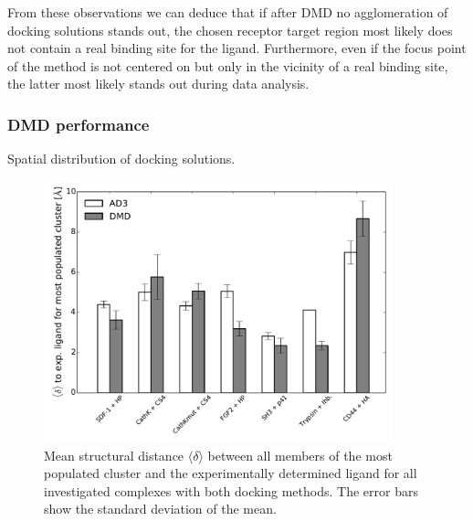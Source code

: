 From these observations we can deduce that if after DMD no agglomeration of
docking solutions stands out, the chosen receptor target region most likely does
not contain a real binding site for the ligand. Furthermore, even if the focus
point of the method is not centered on but only in the vicinity of a real
binding site, the latter most likely stands out during data analysis.

\subsubsection{DMD performance}

{\sffamily Spatial distribution of docking solutions.}

\begin{figure}
\centering
\includegraphics[width=0.9\textwidth]{gfx/dmd/figure_4_clustering_dmd_vs_ad3_plots_pub_004.pdf}
\caption[]{
Mean structural distance $\langle \delta \rangle$ between all members of the
most populated cluster and the experimentally determined ligand for all
investigated complexes with both docking methods. The error bars show the
standard deviation of the mean.
}
\label{fig:dmd:clus_dmd_vs_ad3}
\end{figure}



